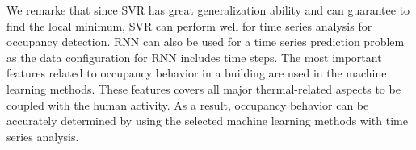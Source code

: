 \textcolor{feb18rev}{We remarke that since SVR has great
  generalization ability and can guarantee to find the local minimum,
  SVR can perform well for time series analysis for occupancy
  detection. RNN can also be used for a time series prediction problem
  as the data configuration for RNN includes time steps. The most
  important features related to occupancy behavior in a building are
  used in the machine learning methods. These features covers all
  major thermal-related aspects to be coupled with the human
  activity. As a result, occupancy behavior can be accurately
  determined by using the selected machine learning methods with time
  series analysis.}

